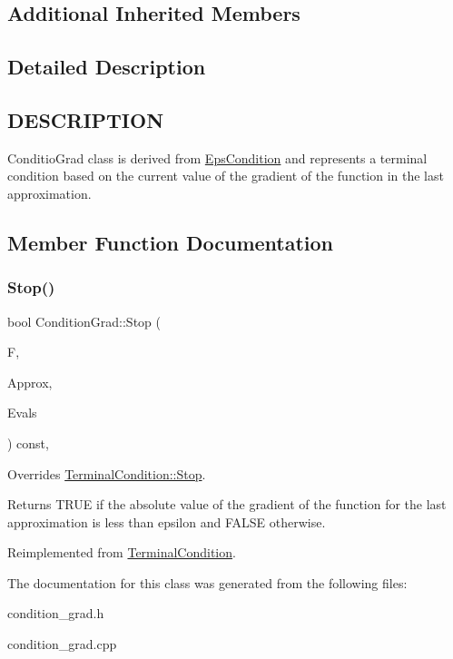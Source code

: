 \subsection*{Additional Inherited Members}


\subsection{Detailed Description}
\hypertarget{function_8h_DESCRIPTION}{}\subsection{D\+E\+S\+C\+R\+I\+P\+T\+I\+ON}\label{function_8h_DESCRIPTION}
Conditio\+Grad class is derived from \hyperlink{class_eps_condition}{Eps\+Condition} and represents a terminal condition based on the current value of the gradient of the function in the last approximation. 

\subsection{Member Function Documentation}
\mbox{\label{class_condition_grad_a28d97a0d0291b24976d4499b904190a7}} 
\subsubsection{\texorpdfstring{Stop()}{Stop()}}
{\footnotesize\ttfamily bool Condition\+Grad\+::\+Stop (\begin{DoxyParamCaption}\item[{std\+::shared\+\_\+ptr$<$ \hyperlink{class_function}{Function} $>$}]{F,  }\item[{const std\+::vector$<$ \hyperlink{classv_point}{v\+Point} $>$ \&}]{Approx,  }\item[{const std\+::vector$<$ double $>$ \&}]{Evals }\end{DoxyParamCaption}) const\hspace{0.3cm}{\ttfamily [override]}, {\ttfamily [virtual]}}

Overrides \hyperlink{class_terminal_condition_ad6294bf2bd6f5e2c6164e461c24d3198}{Terminal\+Condition\+::\+Stop}. \begin{DoxyReturn}{Returns}
T\+R\+UE if the absolute value of the gradient of the function for the last approximation is less than epsilon and F\+A\+L\+SE otherwise. 
\end{DoxyReturn}


Reimplemented from \hyperlink{class_terminal_condition_ad6294bf2bd6f5e2c6164e461c24d3198}{Terminal\+Condition}.



The documentation for this class was generated from the following files\+:\begin{DoxyCompactItemize}
\item 
condition\+\_\+grad.\+h\item 
condition\+\_\+grad.\+cpp\end{DoxyCompactItemize}
